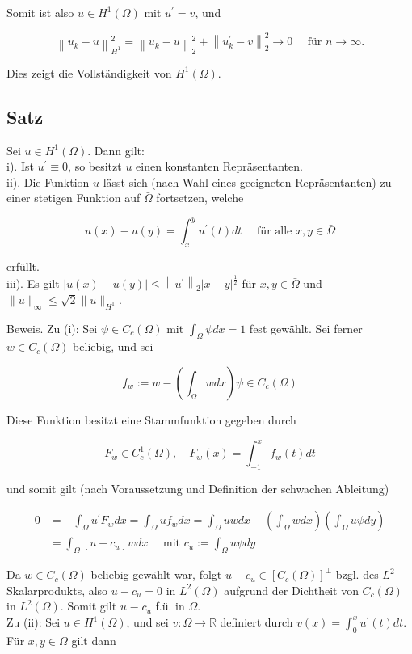 \documentclass[10pt, letterpaper]{article}
\begin{document}
Somit ist also $u \in H^{1}(\Omega)$ mit $u^{\prime}=v$, und

$$
\left\|u_{k}-u\right\|_{H^{1}}^{2}=\left\|u_{k}-u\right\|_{2}^{2}+\left\|u_{k}^{\prime}-v\right\|_{2}^{2} \rightarrow 0 \quad \text { für } n \rightarrow \infty .
$$

Dies zeigt die Vollständigkeit von $H^{1}(\Omega)$.

\subsection*{Satz}
Sei $u \in H^{1}(\Omega)$. Dann gilt:\\
i). Ist $u^{\prime} \equiv 0$, so besitzt $u$ einen konstanten Repräsentanten.\\
ii). Die Funktion $u$ lässt sich (nach Wahl eines geeigneten Repräsentanten) zu einer stetigen Funktion auf $\bar{\Omega}$ fortsetzen, welche

$$
u(x)-u(y)=\int_{x}^{y} u^{\prime}(t) d t \quad \text { für alle } x, y \in \bar{\Omega}
$$

erfüllt.\\
iii). Es gilt $|u(x)-u(y)| \leq\left\|u^{\prime}\right\|_{2}|x-y|^{\frac{1}{2}}$ für $x, y \in \bar{\Omega}$ und $\|u\|_{\infty} \leq \sqrt{2}\|u\|_{H^{1}}$.

Beweis. Zu (i): Sei $\psi \in C_{c}(\Omega)$ mit $\int_{\Omega} \psi d x=1$ fest gewählt. Sei ferner $w \in C_{c}(\Omega)$ beliebig, und sei

$$
f_{w}:=w-\left(\int_{\Omega} w d x\right) \psi \in C_{c}(\Omega)
$$

Diese Funktion besitzt eine Stammfunktion gegeben durch

$$
F_{w} \in C_{c}^{1}(\Omega), \quad F_{w}(x)=\int_{-1}^{x} f_{w}(t) d t
$$

und somit gilt (nach Voraussetzung und Definition der schwachen Ableitung)

$$
\begin{aligned}
0 & =-\int_{\Omega} u^{\prime} F_{w} d x=\int_{\Omega} u f_{w} d x=\int_{\Omega} u w d x-\left(\int_{\Omega} w d x\right)\left(\int_{\Omega} u \psi d y\right) \\
& =\int_{\Omega}\left[u-c_{u}\right] w d x \quad \text { mit } c_{u}:=\int_{\Omega} u \psi d y
\end{aligned}
$$

Da $w \in C_{c}(\Omega)$ beliebig gewählt war, folgt $u-c_{u} \in\left[C_{c}(\Omega)\right]^{\perp}$ bzgl. des $L^{2}$ Skalarprodukts, also $u-c_{u}=0$ in $L^{2}(\Omega)$ aufgrund der Dichtheit von $C_{c}(\Omega)$ in $L^{2}(\Omega)$. Somit gilt $u \equiv c_{u}$ f.ü. in $\Omega$.\\
Zu (ii): Sei $u \in H^{1}(\Omega)$, und sei $v: \Omega \rightarrow \mathbb{R}$ definiert durch $v(x)=\int_{0}^{x} u^{\prime}(t) d t$. Für $x, y \in \Omega$ gilt dann
\end{document}
